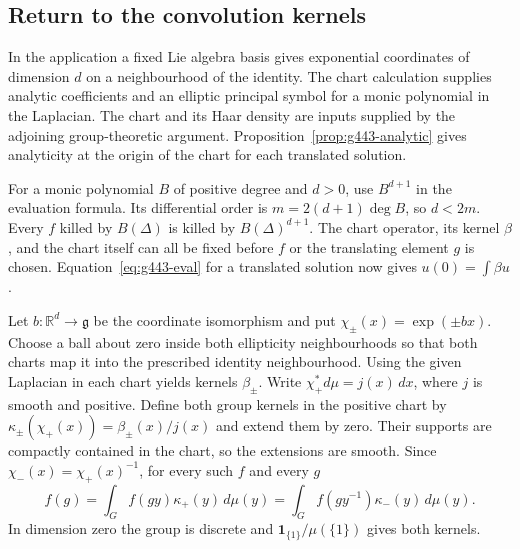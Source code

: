 \subsection{Return to the convolution kernels}
In the application a fixed Lie algebra basis gives exponential coordinates
of dimension \(d\) on a neighbourhood of the identity. The chart
calculation supplies analytic coefficients and an elliptic principal symbol
for a monic polynomial in the Laplacian. The chart and its Haar density
are inputs supplied by the adjoining group-theoretic argument.
Proposition~\ref{prop:g443-analytic} gives analyticity at the origin of the
chart for each translated solution.

For a monic polynomial \(B\) of positive degree and \(d>0\), use
\(B^{d+1}\) in the evaluation formula. Its differential order is
\(m=2(d+1)\deg B\), so \(d<2m\). Every \(f\) killed by \(B(\Delta)\)
is killed by \(B(\Delta)^{d+1}\). The chart operator, its kernel \(\beta\),
and the chart itself can all be fixed before \(f\) or the translating element
\(g\) is chosen. Equation~\eqref{eq:g443-eval} for a translated solution
now gives \(u(0)=\int\beta u\).

Let \(b:\mathbb R^d\to\mathfrak g\) be the coordinate isomorphism and put
\(\chi_\pm(x)=\exp(\pm bx)\). Choose a ball about zero inside both ellipticity
neighbourhoods so that both charts map it into the prescribed identity neighbourhood.
Using the given Laplacian in each chart yields kernels \(\beta_\pm\).
Write \(\chi_+^*d\mu=j(x)\,dx\), where \(j\) is smooth and positive.
Define both group kernels in the positive chart by
\(\kappa_\pm(\chi_+(x))=\beta_\pm(x)/j(x)\) and extend them by zero.
Their supports are compactly contained in the chart, so the extensions are
smooth. Since \(\chi_-(x)=\chi_+(x)^{-1}\), for every such \(f\) and every \(g\)
\[
 f(g)=\int_G f(gy)\kappa_+(y)\,d\mu(y)
     =\int_G f(gy^{-1})\kappa_-(y)\,d\mu(y).
\]
In dimension zero the group is discrete and
\(\boldsymbol{1}_{\{1\}}/\mu(\{1\})\) gives both kernels.

